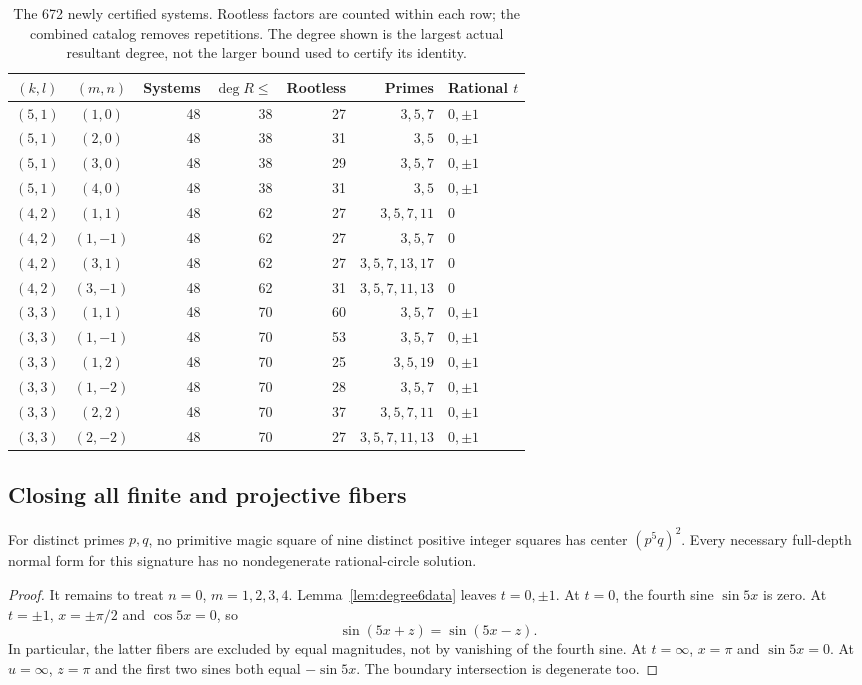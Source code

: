 \begin{table}[htbp]
\centering\small
\setlength{\tabcolsep}{5pt}\renewcommand{\arraystretch}{1.15}
\begin{tabular}{ccrrrrl}
\toprule
$(k,l)$ & $(m,n)$ & Systems & $\deg R\le$ & Rootless & Primes & Rational $t$\\
\midrule
$(5,1)$ & $(1,0)$ & 48 & 38 & 27 & $3,5,7$ & $0,\pm1$\\
$(5,1)$ & $(2,0)$ & 48 & 38 & 31 & $3,5$ & $0,\pm1$\\
$(5,1)$ & $(3,0)$ & 48 & 38 & 29 & $3,5,7$ & $0,\pm1$\\
$(5,1)$ & $(4,0)$ & 48 & 38 & 31 & $3,5$ & $0,\pm1$\\
$(4,2)$ & $(1,1)$ & 48 & 62 & 27 & $3,5,7,11$ & $0$\\
$(4,2)$ & $(1,-1)$ & 48 & 62 & 27 & $3,5,7$ & $0$\\
$(4,2)$ & $(3,1)$ & 48 & 62 & 27 & $3,5,7,13,17$ & $0$\\
$(4,2)$ & $(3,-1)$ & 48 & 62 & 31 & $3,5,7,11,13$ & $0$\\
$(3,3)$ & $(1,1)$ & 48 & 70 & 60 & $3,5,7$ & $0,\pm1$\\
$(3,3)$ & $(1,-1)$ & 48 & 70 & 53 & $3,5,7$ & $0,\pm1$\\
$(3,3)$ & $(1,2)$ & 48 & 70 & 25 & $3,5,19$ & $0,\pm1$\\
$(3,3)$ & $(1,-2)$ & 48 & 70 & 28 & $3,5,7$ & $0,\pm1$\\
$(3,3)$ & $(2,2)$ & 48 & 70 & 37 & $3,5,7,11$ & $0,\pm1$\\
$(3,3)$ & $(2,-2)$ & 48 & 70 & 27 & $3,5,7,11,13$ & $0,\pm1$\\
\bottomrule
\end{tabular}
\caption{The 672 newly certified systems. Rootless factors are counted within each row; the combined catalog removes repetitions. The degree shown is the largest actual resultant degree, not the larger bound used to certify its identity.}\label{tab:degree6}
\end{table}

\subsection{Closing all finite and projective fibers}
\begin{theorem}\label{thm:51}
For distinct primes $p,q$, no primitive magic square of nine distinct positive integer squares has center $(p^5q)^2$. Every necessary full-depth normal form for this signature has no nondegenerate rational-circle solution.
\end{theorem}
\begin{proof}
It remains to treat $n=0$, $m=1,2,3,4$. Lemma~\ref{lem:degree6data} leaves $t=0,\pm1$. At $t=0$, the fourth sine $\sin5x$ is zero. At $t=\pm1$, $x=\pm\pi/2$ and $\cos5x=0$, so
\[
\sin(5x+z)=\sin(5x-z).
\]
In particular, the latter fibers are excluded by equal magnitudes, not by vanishing of the fourth sine. At $t=\infty$, $x=\pi$ and $\sin5x=0$. At $u=\infty$, $z=\pi$ and the first two sines both equal $-\sin5x$. The boundary intersection is degenerate too.
\end{proof}

